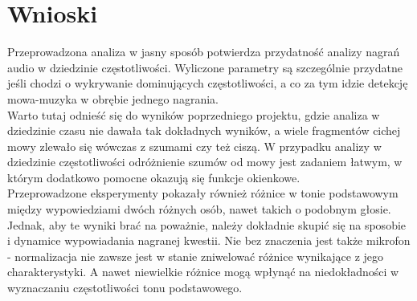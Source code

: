\documentclass[a4paper]{article}
\begin{document}
\section{Wnioski}
Przeprowadzona analiza w jasny sposób potwierdza przydatność analizy nagrań audio w dziedzinie częstotliwości. Wyliczone parametry są szczególnie przydatne jeśli chodzi o wykrywanie dominujących częstotliwości, a co za tym idzie detekcję mowa-muzyka w obrębie jednego nagrania.\\
Warto tutaj odnieść się do wyników poprzedniego projektu, gdzie analiza w dziedzinie czasu nie dawała tak dokładnych wyników, a wiele fragmentów cichej mowy zlewało się wówczas z szumami czy też ciszą. W przypadku analizy w dziedzinie częstotliwości odróżnienie szumów od mowy jest zadaniem łatwym, w którym dodatkowo pomocne okazują się funkcje okienkowe.\\
Przeprowadzone eksperymenty pokazały również różnice w tonie podstawowym między wypowiedziami dwóch różnych osób, nawet takich o podobnym głosie. Jednak, aby te wyniki brać na poważnie, należy dokładnie skupić się na sposobie i dynamice wypowiadania nagranej kwestii. Nie bez znaczenia jest także mikrofon - normalizacja nie zawsze jest w stanie zniwelować różnice wynikające z jego charakterystyki. A nawet niewielkie różnice mogą wpłynąć na niedokładności w wyznaczaniu częstotliwości tonu podstawowego.


\end{document}
